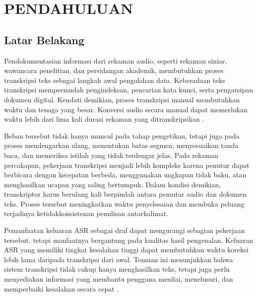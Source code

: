 \chapter{PENDAHULUAN}

\section{Latar Belakang}
Pendokumentasian informasi dari rekaman audio, seperti rekaman siniar, wawancara penelitian, dan persidangan akademik, membutuhkan proses transkripsi teks sebagai langkah awal pengolahan data. Keberadaan teks transkripsi mempermudah pengindeksan, pencarian kata kunci, serta pengarsipan dokumen digital. Kendati demikian, proses transkripsi manual membutuhkan waktu dan tenaga yang besar. Konversi audio secara manual dapat memerlukan waktu lebih dari lima kali durasi rekaman yang ditranskripsikan .

Beban tersebut tidak hanya muncul pada tahap pengetikan, tetapi juga pada proses mendengarkan ulang, menentukan batas segmen, menyesuaikan tanda baca, dan memeriksa istilah yang tidak terdengar jelas. Pada rekaman percakapan, pekerjaan transkripsi menjadi lebih kompleks karena penutur dapat berbicara dengan kecepatan berbeda, menggunakan ungkapan tidak baku, atau menghasilkan ucapan yang saling bertumpuk. Dalam kondisi demikian, transkriptor harus berulang kali berpindah antara pemutar audio dan dokumen teks. Proses tersebut meningkatkan waktu penyelesaian dan membuka peluang terjadinya ketidakkonsistenan penulisan antarkalimat.

Pemanfaatan keluaran ASR sebagai draf dapat mengurangi sebagian pekerjaan tersebut, tetapi manfaatnya bergantung pada kualitas hasil pengenalan. Keluaran ASR yang memiliki tingkat kesalahan tinggi dapat membutuhkan waktu koreksi lebih lama daripada transkripsi dari awal. Temuan ini menunjukkan bahwa sistem transkripsi tidak cukup hanya menghasilkan teks, tetapi juga perlu menyediakan informasi yang membantu pengguna menilai, menelusuri, dan memperbaiki kesalahan secara cepat .


